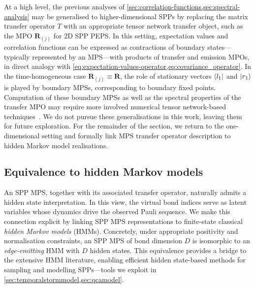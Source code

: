 At a high level, the previous analyses of \cref{sec:correlation-functions,sec:spectral-analysis} may be generalised to higher-dimensional SPPs by replacing the matrix transfer operator \(T\) with an appropriate tensor network transfer object, such as the MPO \(\mathbf{R}_{(j)}\) for 2D SPP PEPS. In this setting, expectation values and correlation functions can be expressed as contractions of boundary states---typically represented by an MPS---with products of transfer and emission MPOs, in direct analogy with \cref{eq:expectation-values-operator,eq:covariance_operator}. In the time-homogeneous case \(\mathbf{R}_{(j)} \equiv \mathbf{R}\), the role of stationary vectors \(\bra{l_1}\) and \(\ket{r_1}\) is played by boundary MPSs, corresponding to boundary fixed points. Computation of these boundary MPSs as well as the spectral properties of the transfer MPO may require more involved numerical tensor network-based techniques~\cite{orusPracticalIntroductionTensor2014,bravyiEfficientAlgorithmsMaximum2014,strathearnEfficientNonMarkovianQuantum2018,keelingProcessTensorApproaches2025}. We do not pursue these generalisations in this work, leaving them for future exploration. For the remainder of the section, we return to the one-dimensional setting and formally link MPS transfer operator description to hidden Markov model realisations.

\subsection{Equivalence to hidden Markov models}
An SPP MPS, together with its associated transfer operator, naturally admits a hidden state interpretation. In this view, the virtual bond indices serve as latent variables whose dynamics drive the observed Pauli sequence. We make this connection explicit by linking SPP MPS representations to finite-state classical \emph{hidden Markov models} (HMMs). Concretely, under appropriate positivity and normalisation constraints, an SPP MPS of bond dimension \(D\) is isomorphic to an \emph{edge-emitting} HMM with \(D\) hidden states. This equivalence provides a bridge to the extensive HMM literature, enabling efficient hidden state-based methods for sampling and modelling SPPs---tools we exploit in \cref{sec:temporalstormmodel,sec:qcamodel}.

